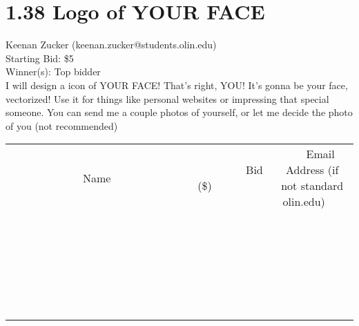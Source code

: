 \documentclass[11pt]{article}
\begin{document}
\section*{1.38 Logo of YOUR FACE}
Keenan Zucker (keenan.zucker@students.olin.edu) \\
Starting Bid: \$5 \\
Winner(s): 
Top bidder \\
I will design a icon of YOUR FACE! That's right, YOU! It's gonna be your face, vectorized! Use it for things like personal websites or impressing that special someone. You can send me a couple photos of yourself, or let me decide the photo of you (not recommended) \\[6ex]
\begin{tabular}{c c c}
~~~~~~~~~~~~~Name~~~~~~~~~~~~~ & ~~~~~~~~~Bid (\$)~~~~~~~~~ & ~~~Email Address (if not standard olin.edu)~~~ \\
 & & \\
\hline
 & & \\
\hline
 & & \\
\hline
 & & \\
\hline
 & & \\
\hline
 & & \\
\hline
 & & \\
\hline
 & & \\
\hline
 & & \\
\hline
 & & \\
\hline
 & & \\
\hline
 & & \\
\hline
 & & \\
\hline
 & & \\
\hline
 & & \\
\hline
 & & \\
\hline
 & & \\
\hline
 & & \\
\hline
 & & \\
\hline
 & & \\
\hline
 & & \\
\hline
 & & \\
\hline
 & & \\
\hline
 & & \\
\hline
 & & \\
\hline
 & & \\
\hline
\end{tabular}
\clearpage
\end{document}
